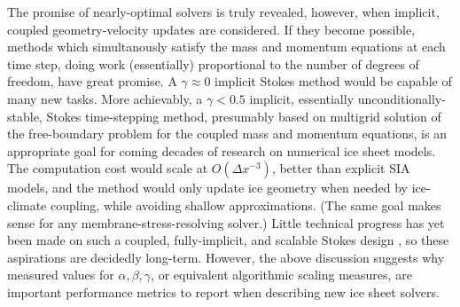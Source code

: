 \documentclass[review,letterpaper]{igs}
\begin{document}
The promise of nearly-optimal solvers is truly revealed, however, when implicit, coupled geometry-velocity updates are considered.  If they become possible, methods which simultanously satisfy the mass and momentum equations at each time step, doing work (essentially) proportional to the number of degrees of freedom, have great promise.  A $\gamma \approx 0$ implicit Stokes method would be capable of many new tasks.  More achievably, a $\gamma < 0.5$ implicit, essentially unconditionally-stable, Stokes time-stepping method, presumably based on multigrid solution of the free-boundary problem for the coupled mass and momentum equations, is an appropriate goal for coming decades of research on numerical ice sheet models.  The computation cost would scale at $O(\Delta x^{-3})$, better than explicit SIA models, and the method would only update ice geometry when needed by ice-climate coupling, while avoiding shallow approximations.  (The same goal makes sense for any membrane-stress-resolving solver.)  Little technical progress has yet been made on such a coupled, fully-implicit, and scalable Stokes design \cite[but see][]{WirbelJarosch2020}, so these aspirations are decidedly long-term.  However, the above discussion suggests why measured values for $\alpha,\beta,\gamma$, or equivalent algorithmic scaling measures, are important performance metrics to report when describing new ice sheet solvers.



\end{document}
